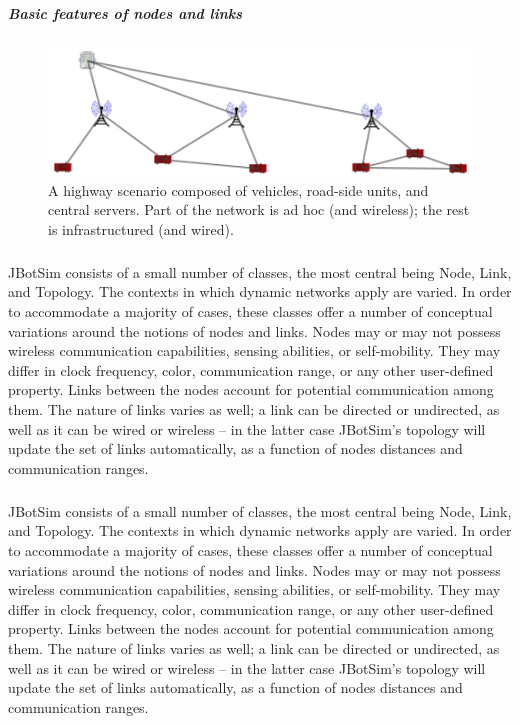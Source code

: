 \subparagraph{Basic features of nodes and links} 
\begin{figure}[h!]
	\centering
	\includegraphics[width=0.7\linewidth]{fig_2}
	\caption[A highway scenario composed of vehicles, road-side units, and central servers. Part of the network is ad hoc (and wireless); the rest is infrastructured (and wired).]{A highway scenario composed of vehicles, road-side units, and central servers. Part of the network is ad hoc (and wireless); the rest is infrastructured (and wired).}
	\label{fig:fig2}
\end{figure}
\subparagraph{} JBotSim consists of a small number of classes, the most central being Node, Link, and Topology. The contexts in which dynamic networks apply are varied. In order to accommodate a majority of cases, these classes offer a number of conceptual variations around the notions of nodes and links. Nodes may or may not possess wireless communication capabilities, sensing abilities, or self-mobility. They may differ in clock frequency, color, communication range, or any other user-defined property. Links between the nodes account for potential communication among them. The nature of links varies as well; a link can be directed or undirected, as well as it can be wired or wireless – in the latter case  JBotSim's topology will update the set of links automatically, as a function of nodes distances and communication ranges.
\subparagraph{} JBotSim  consists of a small number of classes, the most central being Node, Link, and Topology. The contexts in which dynamic networks apply are varied. In order to accommodate a majority of cases, these classes offer a number of conceptual variations around the notions of nodes and links. Nodes may or may not possess wireless communication capabilities, sensing abilities, or self-mobility. They may differ in clock frequency, color, communication range, or any other user-defined property. Links between the nodes account for potential communication among them.
\newpage
The nature of links varies as well; a link can be directed or undirected, as well as it can be wired or wireless – in the latter case JBotSim's topology will update the set of links automatically, as a function of nodes distances and communication ranges.

